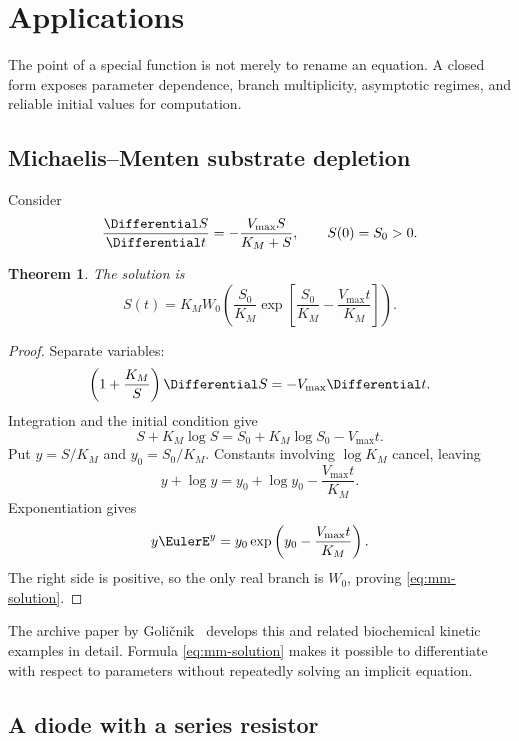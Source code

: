 \documentclass[11pt]{article}
\newtheorem{theorem}{Theorem}[section]
\theoremstyle{remark}
\begin{document}
\section{Applications}\label{sec:applications}

The point of a special function is not merely to rename an equation.  A
closed form exposes parameter dependence, branch multiplicity, asymptotic
regimes, and reliable initial values for computation.

\subsection{Michaelis--Menten substrate depletion}

Consider
\begin{equation}\label{eq:mm-ode}
       \frac{\Differential S}{\Differential t}
       =-\frac{V_{\max}S}{K_M+S},
       \qquad S(0)=S_0>0.
\end{equation}

\begin{theorem}\label{thm:mm}
The solution is
\begin{equation}\label{eq:mm-solution}
 S(t)=K_M W_0\left(
 \frac{S_0}{K_M}
 \exp\left[
 \frac{S_0}{K_M}-\frac{V_{\max}t}{K_M}
 \right]\right).
\end{equation}
\end{theorem}

\begin{proof}
Separate variables:
\[
       \left(1+\frac{K_M}{S}\right)\Differential S=-V_{\max}\Differential t.
\]
Integration and the initial condition give
\[
       S+K_M\log S
       =S_0+K_M\log S_0-V_{\max}t.
\]
Put \(y=S/K_M\) and \(y_0=S_0/K_M\).  Constants involving
\(\log K_M\) cancel, leaving
\[
       y+\log y=y_0+\log y_0-\frac{V_{\max}t}{K_M}.
\]
Exponentiation gives
\[
       y\EulerE^y
       =y_0\exp\left(y_0-\frac{V_{\max}t}{K_M}\right).
\]
The right side is positive, so the only real branch is \(W_0\), proving
\eqref{eq:mm-solution}.
\end{proof}

The archive paper by Goli\v{c}nik~\cite{golicnik2012} develops this and
related biochemical kinetic examples in detail.  Formula \eqref{eq:mm-solution} makes it possible to
differentiate with respect to parameters without repeatedly solving an
implicit equation.

\subsection{A diode with a series resistor}
\end{document}
